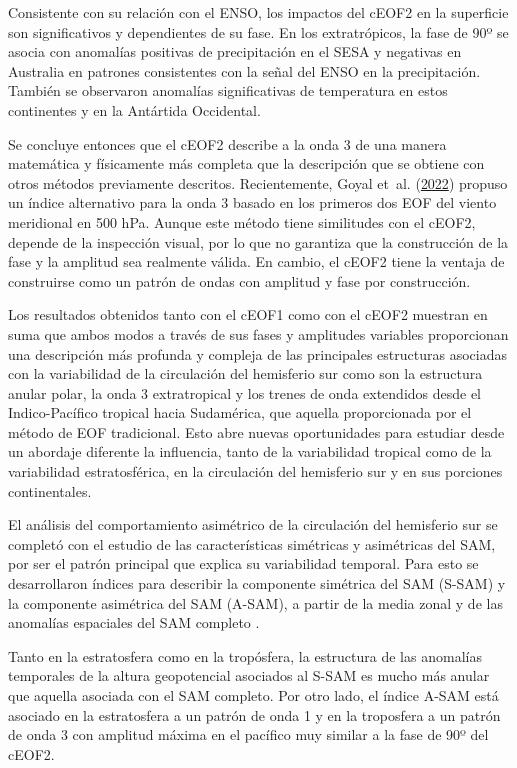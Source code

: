 \documentclass[12pt,oneside,a4paper]{reedthesis}
\begin{document}
Consistente con su relación con el ENSO, los impactos del cEOF2 en la superficie son significativos y dependientes de su fase.
En los extratrópicos, la fase de 90º se asocia con anomalías positivas de precipitación en el SESA y negativas en Australia en patrones consistentes con la señal del ENSO en la precipitación.
También se observaron anomalías significativas de temperatura en estos continentes y en la Antártida Occidental.

Se concluye entonces que el cEOF2 describe a la onda 3 de una manera matemática y físicamente más completa que la descripción que se obtiene con otros métodos previamente descritos.
Recientemente, Goyal et~al. (\protect\hyperlink{ref-goyal2022}{2022}) propuso un índice alternativo para la onda 3 basado en los primeros dos EOF del viento meridional en 500 hPa.
Aunque este método tiene similitudes con el cEOF2, depende de la inspección visual, por lo que no garantiza que la construcción de la fase y la amplitud sea realmente válida.
En cambio, el cEOF2 tiene la ventaja de construirse como un patrón de ondas con amplitud y fase por construcción.

Los resultados obtenidos tanto con el cEOF1 como con el cEOF2 muestran en suma que ambos modos a través de sus fases y amplitudes variables proporcionan una descripción más profunda y compleja de las principales estructuras asociadas con la variabilidad de la circulación del hemisferio sur como son la estructura anular polar, la onda 3 extratropical y los trenes de onda extendidos desde el Indico-Pacífico tropical hacia Sudamérica, que aquella proporcionada por el método de EOF tradicional.
Esto abre nuevas oportunidades para estudiar desde un abordaje diferente la influencia, tanto de la variabilidad tropical como de la variabilidad estratosférica, en la circulación del hemisferio sur y en sus porciones continentales.

El análisis del comportamiento asimétrico de la circulación del hemisferio sur se completó con el estudio de las características simétricas y asimétricas del SAM, por ser el patrón principal que explica su variabilidad temporal.
Para esto se desarrollaron índices para describir la componente simétrica del SAM (S-SAM) y la componente asimétrica del SAM (A-SAM), a partir de la media zonal y de las anomalías espaciales del SAM completo .

Tanto en la estratosfera como en la tropósfera, la estructura de las anomalías temporales de la altura geopotencial asociados al S-SAM es mucho más anular que aquella asociada con el SAM completo.
Por otro lado, el índice A-SAM está asociado en la estratosfera a un patrón de onda 1 y en la troposfera a un patrón de onda 3 con amplitud máxima en el pacífico muy similar a la fase de 90º del cEOF2.
\end{document}
